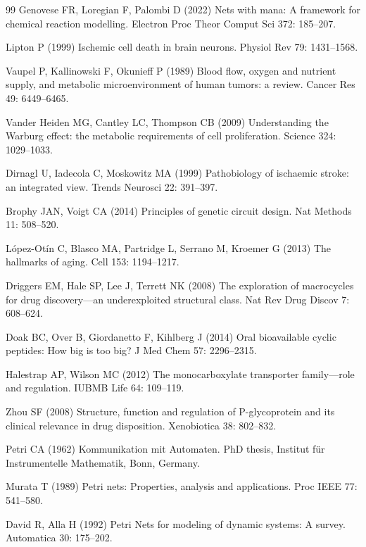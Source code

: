 \documentclass[10pt,letterpaper]{article}
\begin{document}
\begin{thebibliography}{99}
Genovese FR, Loregian F, Palombi D (2022) Nets with mana: A framework for chemical reaction modelling. Electron Proc Theor Comput Sci 372: 185--207.

Lipton P (1999) Ischemic cell death in brain neurons. Physiol Rev 79: 1431--1568.

Vaupel P, Kallinowski F, Okunieff P (1989) Blood flow, oxygen and nutrient supply, and metabolic microenvironment of human tumors: a review. Cancer Res 49: 6449--6465.

Vander Heiden MG, Cantley LC, Thompson CB (2009) Understanding the Warburg effect: the metabolic requirements of cell proliferation. Science 324: 1029--1033.

Dirnagl U, Iadecola C, Moskowitz MA (1999) Pathobiology of ischaemic stroke: an integrated view. Trends Neurosci 22: 391--397.

Brophy JAN, Voigt CA (2014) Principles of genetic circuit design. Nat Methods 11: 508--520.

López-Otín C, Blasco MA, Partridge L, Serrano M, Kroemer G (2013) The hallmarks of aging. Cell 153: 1194--1217.

Driggers EM, Hale SP, Lee J, Terrett NK (2008) The exploration of macrocycles for drug discovery---an underexploited structural class. Nat Rev Drug Discov 7: 608--624.

Doak BC, Over B, Giordanetto F, Kihlberg J (2014) Oral bioavailable cyclic peptides: How big is too big? J Med Chem 57: 2296--2315.

Halestrap AP, Wilson MC (2012) The monocarboxylate transporter family---role and regulation. IUBMB Life 64: 109--119.

Zhou SF (2008) Structure, function and regulation of P-glycoprotein and its clinical relevance in drug disposition. Xenobiotica 38: 802--832.

Petri CA (1962) Kommunikation mit Automaten. PhD thesis, Institut für Instrumentelle Mathematik, Bonn, Germany.

Murata T (1989) Petri nets: Properties, analysis and applications. Proc IEEE 77: 541--580.

David R, Alla H (1992) Petri Nets for modeling of dynamic systems: A survey. Automatica 30: 175--202.


\end{thebibliography}
\end{document}
